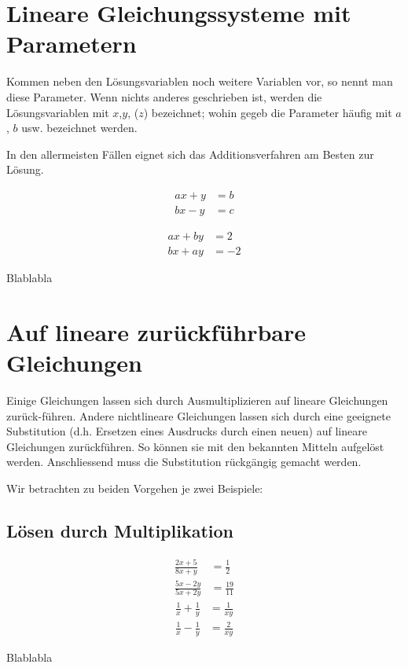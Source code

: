 \documentclass[11pt,oneside]{article}
\begin{document}
\section{Lineare Gleichungssysteme mit Parametern}
Kommen neben den Lösungsvariablen noch weitere Variablen vor, so nennt man diese Parameter. Wenn nichts anderes geschrieben ist, werden die Lösungsvariablen mit $x$,$y$, ($z$) bezeichnet; wohin gegeb die Parameter häufig mit $a$, $b$ usw. bezeichnet werden.\vspace{5mm}

In den allermeisten Fällen eignet sich das Additionsverfahren am Besten zur Lösung.
\begin{beispiel}
	\begin{align*}
		ax + y &= b\\
		bx - y &= c
	\end{align*}
	\vspace{3cm}
\end{beispiel}
\begin{beispiel}
	\begin{align*}
		a x + by &= 2\\
		bx + ay &= -2
	\end{align*}
	\vspace{3cm}
\end{beispiel}
\begin{aufgabe}
	Blablabla
	\vspace{4cm}
\end{aufgabe}
\newpage


\section{Auf lineare zurückführbare Gleichungen}
Einige Gleichungen lassen sich durch Ausmultiplizieren auf lineare Gleichungen zurück-führen. Andere nichtlineare Gleichungen lassen sich durch eine geeignete Substitution (d.h. Ersetzen eines Ausdrucks durch einen neuen) auf lineare Gleichungen zurückführen. So können sie mit den bekannten Mitteln aufgelöst werden. Anschliessend muss die Substitution rückgängig gemacht werden.

Wir betrachten zu beiden Vorgehen je zwei Beispiele:
\subsection*{Lösen durch Multiplikation}
\begin{beispiel}
	\begin{align*}
		\frac{2x+5}{8x+y}&=\frac{1}{2}\\
		\frac{5x-2y}{5x+2y}&=\frac{19}{11}
	\end{align*}\vspace{3cm}
	\begin{align*}
		\frac{1}{x}+\frac{1}{y}&=\frac{1}{xy}\\
		\frac{1}{x}-\frac{1}{y}&=\frac{2}{xy}
	\end{align*}\vspace{4cm}
\end{beispiel}
\begin{aufgabe}
	Blablabla
	\vspace{2cm}
\end{aufgabe}
\end{document}
